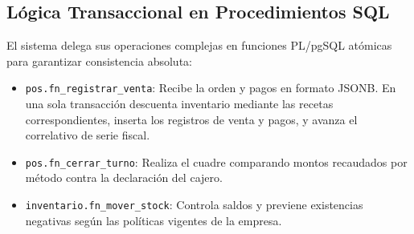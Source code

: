 \subsection{Lógica Transaccional en Procedimientos SQL}
El sistema delega sus operaciones complejas en funciones PL/pgSQL atómicas para garantizar consistencia absoluta:
\begin{itemize}
    \item \texttt{pos.fn\_registrar\_venta}: Recibe la orden y pagos en formato JSONB. En una sola transacción descuenta inventario mediante las recetas correspondientes, inserta los registros de venta y pagos, y avanza el correlativo de serie fiscal.
    \item \texttt{pos.fn\_cerrar\_turno}: Realiza el cuadre comparando montos recaudados por método contra la declaración del cajero.
    \item \texttt{inventario.fn\_mover\_stock}: Controla saldos y previene existencias negativas según las políticas vigentes de la empresa.
\end{itemize}
